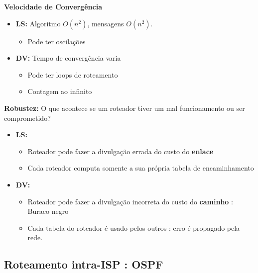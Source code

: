             \textbf{Velocidade de Convergência} 
            \begin{itemize}[left=0.5cm, align=left, nosep]
                \item \textbf{LS:} Algoritmo $O(n^2)$, mensagens $O(n^2)$.   
                \begin{itemize}[left=0.5cm, nosep, label=$\hookrightarrow$]
                    \item Pode ter oscilações
                \end{itemize}
                \item \textbf{DV:} Tempo de convergência varia
                \begin{itemize}[left=0.5cm, nosep, label=$\hookrightarrow$]
                    \item Pode ter loops de roteamento
                    \item Contagem ao infinito
                \end{itemize}
            \end{itemize}

            \textbf{Robustez:} O que acontece se um roteador tiver um mal funcionamento ou ser comprometido?
            \begin{itemize}[left=0.5cm, align=left, nosep]
                \item \textbf{LS:}  
                \begin{itemize}[left=0.5cm, nosep, label=$\hookrightarrow$]
                    \item Roteador pode fazer a divulgação errada do custo do \textbf{enlace}
                    \item Cada roteador computa somente a sua própria tabela de encaminhamento
                \end{itemize}
                \item \textbf{DV:}
                \begin{itemize}[left=0.5cm, nosep, label=$\hookrightarrow$]
                    \item Roteador pode fazer a divulgação incorreta do custo do \textbf{caminho} : Buraco negro 
                    \item Cada tabela do roteador é usado pelos outros : erro é propagado pela rede.
                \end{itemize}
            \end{itemize}

    \subsection{Roteamento intra-ISP : OSPF}

